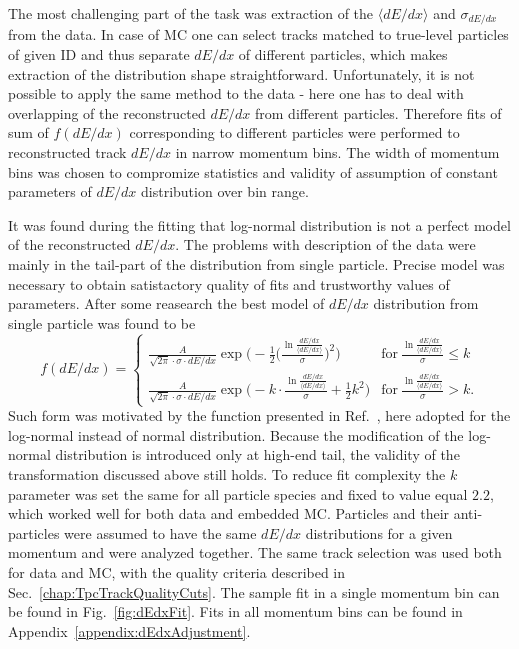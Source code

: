 The most challenging part of the task was extraction of the $\langle dE/dx\rangle$ and $\sigma_{dE/dx}$ from the data. In case of MC one can select tracks matched to true-level particles of given ID and thus separate $dE/dx$ of different particles, which makes extraction of the distribution shape straightforward. Unfortunately, it is not possible to apply the same method to the data - here one has to deal with overlapping of the reconstructed $dE/dx$ from different particles. Therefore fits of sum of $f(dE/dx)$ corresponding to different particles were performed to reconstructed track $dE/dx$ in narrow momentum bins. The width of momentum bins was chosen to compromize statistics and validity of assumption of constant parameters of $dE/dx$ distribution over bin range.

It was found during the fitting that log-normal distribution is not a perfect model of the reconstructed $dE/dx$. The problems with description of the data were mainly in the tail-part of the distribution from single particle. Precise model was necessary to obtain satistactory quality of fits and trustworthy values of parameters. After some reasearch the best model of $dE/dx$ distribution from single particle was found to be%
%
\begin{equation}\label{eq:expTail}
	f(dE/dx)=\left\{
                \begin{array}{ll}
                  \frac{A}{\sqrt{2\pi}\cdot \sigma\cdot dE/dx}\exp{\Bigg(-\frac{1}{2}\Big(\frac{\ln{\frac{dE/dx}{\langle dE/dx\rangle}}}{\sigma}\Big)^{2}\Bigg)} & \textrm{for}~\frac{\ln{\frac{dE/dx}{\langle dE/dx\rangle}}}{\sigma} \leq k \\
                  \frac{A}{\sqrt{2\pi}\cdot \sigma\cdot dE/dx}\exp{\Bigg(-k\cdot \frac{\ln{\frac{dE/dx}{\langle dE/dx\rangle}}}{\sigma} + \frac{1}{2}k^{2} \Bigg)} & \textrm{for}~\frac{\ln{\frac{dE/dx}{\langle dE/dx\rangle}}}{\sigma} > k.
                \end{array}
              \right.
\end{equation}%
%
Such form was motivated by the function presented in Ref.~\cite{AlternativeToCrystallBall}, here adopted for the log-normal instead of normal distribution. Because the modification of the log-normal distribution is introduced only at high-end tail, the validity of the transformation discussed above still holds. To reduce fit complexity the $k$ parameter was set the same for all particle species and fixed  to value equal $2.2$, which worked well for both data and embedded MC. Particles and their anti-particles were assumed to have the same $dE/dx$ distributions for a given momentum and were analyzed together. The same track selection was used both for data and MC, with the quality criteria described in Sec.~\ref{chap:TpcTrackQualityCuts}. The sample fit in a single momentum bin can be found in Fig.~\ref{fig:dEdxFit}. Fits in all momentum bins can be found in Appendix~\ref{appendix:dEdxAdjustment}.
